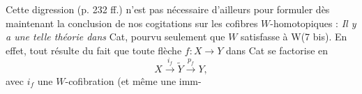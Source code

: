 \documentclass[11pt]{article}
\begin{document}
Cette digression (p. 232 ff.) n'est pas nécessaire d'ailleurs pour formuler dès maintenant la conclusion de nos cogitations sur les cofibres $W$-homotopiques : \textit{Il y a une telle théorie dans} Cat, pourvu seulement que $W$ satisfasse à W(7 bis). En effet, tout résulte du fait que toute flèche $f : X \longrightarrow Y$ dans Cat se factorise en
\[
X \xrightarrow{i_f} \tilde{Y} \xrightarrow{p_f} Y,
\]
avec $i_f$ une $W$-cofibration (et même une imm-
\end{document}
